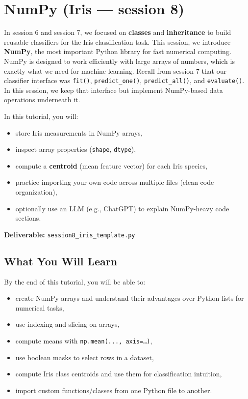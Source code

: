 \section{NumPy (Iris — session 8)}

\noindent
In session 6 and session 7, we focused on \textbf{classes} and \textbf{inheritance} to build reusable classifiers for the Iris classification task.
This session, we introduce \textbf{NumPy}, the most important Python library for fast numerical computing. NumPy is designed to work efficiently with large arrays of numbers, which is exactly what we need for machine learning.
Recall from session 7 that our classifier interface was \texttt{fit()}, \texttt{predict\_one()}, \texttt{predict\_all()}, and \texttt{evaluate()}.
In this session, we keep that interface but implement NumPy-based data operations underneath it.

\noindent
In this tutorial, you will:
\begin{itemize}\setlength{\itemsep}{0pt}
\item store Iris measurements in NumPy arrays,
\item inspect array properties (\texttt{shape}, \texttt{dtype}),
\item compute a \textbf{centroid} (mean feature vector) for each Iris species,
\item practice importing your own code across multiple files (clean code organization),
\item optionally use an LLM (e.g., ChatGPT) to explain NumPy-heavy code sections.
\end{itemize}

\noindent
\textbf{Deliverable:} \texttt{session8\_iris\_template.py}

\subsection{What You Will Learn}
By the end of this tutorial, you will be able to:
\begin{itemize}\setlength{\itemsep}{0pt}
\item create NumPy arrays and understand their advantages over Python lists for numerical tasks,
\item use indexing and slicing on arrays,
\item compute means with \texttt{np.mean(..., axis=\dots)},
\item use boolean masks to select rows in a dataset,
\item compute Iris class centroids and use them for classification intuition,
\item import custom functions/classes from one Python file to another.
\end{itemize}

